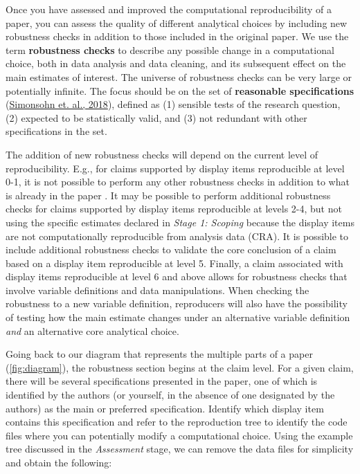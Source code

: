 \documentclass[]{book}
\begin{document}
Once you have assessed and improved the computational reproducibility of a paper, you can assess the quality of different analytical choices by including new robustness checks in addition to those included in the original paper. We use the term \textbf{robustness checks} to describe any possible change in a computational choice, both in data analysis and data cleaning, and its subsequent effect on the main estimates of interest. The universe of robustness checks can be very large or potentially infinite. The focus should be on the set of \textbf{reasonable specifications} (\href{https://urisohn.com/sohn_files/wp/wordpress/wp-content/uploads/Paper-Specification-curve-2018-11-02.pdf}{Simonsohn et. al., 2018}), defined as (1) sensible tests of the research question, (2) expected to be statistically valid, and (3) not redundant with other specifications in the set.

The addition of new robustness checks will depend on the current level of reproducibility. E.g., for claims supported by display items reproducible at level 0-1, it is not possible to perform any other robustness checks in addition to what is already in the paper \citep[include a brief explanation why: because\ldots{}]{fhoces}. It may be possible to perform additional robustness checks for claims supported by display items reproducible at levels 2-4, but not using the specific estimates declared in \emph{Stage 1: Scoping} because the display items are not computationally reproducible from analysis data (CRA). It is possible to include additional robustness checks to validate the core conclusion of a claim based on a display item reproducible at level 5. Finally, a claim associated with display items reproducible at level 6 and above allows for robustness checks that involve variable definitions and data manipulations. When checking the robustness to a new variable definition, reproducers will also have the possibility of testing how the main estimate changes under an alternative variable definition \emph{and} an alternative core analytical choice. \citep[please verify whether this is what you meant to say in the last 2 sentences]{fhoces}

Going back to our diagram that represents the multiple parts of a paper (\ref{fig:diagram}), the robustness section begins at the claim level. For a given claim, there will be several specifications presented in the paper, one of which is identified by the authors (or yourself, in the absence of one designated by the authors) as the main or preferred specification. Identify which display item contains this specification and refer to the reproduction tree to identify the code files where you can potentially modify a computational choice. Using the example tree discussed in the \emph{Assessment} stage, we can remove the data files for simplicity and obtain the following:
\end{document}
